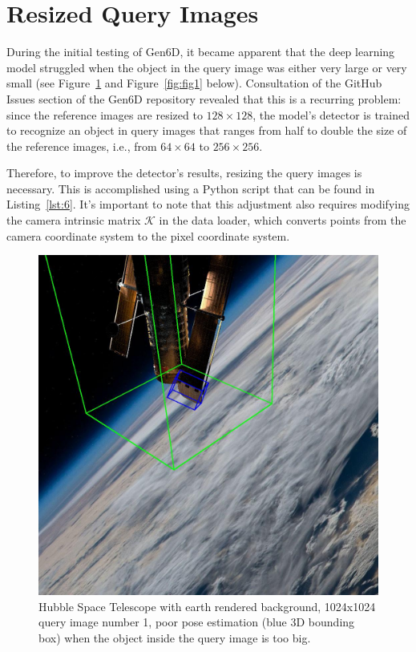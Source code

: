\bigskip

\section{Resized Query Images}

During the initial testing of Gen6D, it became apparent that the deep learning model struggled when the object in the query image was either very large or very small (see Figure~\ref{fig:fig2} and Figure~\ref{fig:fig1} below). Consultation of the GitHub Issues section of the Gen6D repository revealed that this is a recurring problem: since the reference images are resized to $128\times 128$, the model's detector is trained to recognize an object in query images that ranges from half to double the size of the reference images, i.e., from $64\times 64$ to $256\times 256$.

\bigskip

Therefore, to improve the detector's results, resizing the query images is necessary. This is accomplished using a Python script that can be found in Listing~\ref{lst:6}. It's important to note that this adjustment also requires modifying the camera intrinsic matrix $\bm{\mathcal{K}}$ in the data loader, which converts points from the camera coordinate system to the pixel coordinate system.

\pagebreak


\begin{figure}[H]
    \centering
    \includegraphics[width=0.70\linewidth]{data/fig2.jpg}
    \caption{Hubble Space Telescope with earth rendered background, 1024x1024 query image number 1, poor pose estimation (blue 3D bounding box) when the object inside the query image is too big.}
    \label{fig:fig2}
\end{figure}


